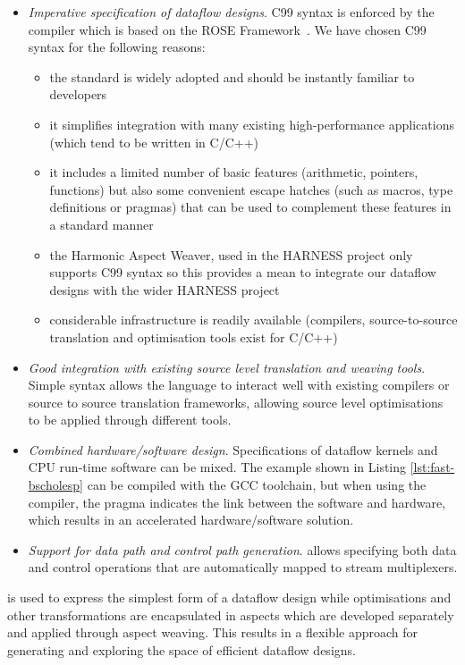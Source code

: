 \begin{itemize}
\item \emph{Imperative specification of dataflow designs}. C99 syntax
  is enforced by the \FAST{} compiler which is based on the ROSE
  Framework~\cite{Quinlan:2000}. We have chosen C99 syntax for the following reasons:
\begin{itemize}
\item the standard is widely adopted and should be instantly familiar
  to developers
\item it simplifies integration with many existing high-performance
  applications (which tend to be written in C/C++)
\item it includes a limited number of basic features (arithmetic,
  pointers, functions) but also some convenient escape hatches (such
  as macros, type definitions or pragmas) that can be used to
  complement these features in a standard manner
\item the Harmonic Aspect Weaver, used in the HARNESS project only
  supports C99 syntax so this provides a mean to integrate our
  dataflow designs with the wider HARNESS project
\item considerable infrastructure is readily available (compilers,
  source-to-source translation and optimisation tools exist for C/C++)
\end{itemize}
\item \emph{Good integration with existing source level translation and
    weaving tools}. Simple syntax allows the language to interact well
  with existing compilers or source to source translation frameworks,
  allowing source level optimisations to be applied through different
  tools.
\item \emph{Combined hardware/software design}. Specifications of dataflow
  kernels and CPU run-time software can be mixed. The example shown in
  Listing \ref{lst:fast-bscholesp} can be compiled with the GCC toolchain,
  but when using the \FAST{} compiler, the pragma indicates the link
  between the software and hardware, which results in an accelerated
  hardware/software solution.
\item \emph{Support for data path and control path generation}. \FAST{}
  allows specifying both data and control operations that are
  automatically mapped to stream multiplexers.
\end{itemize}

\FAST{} is used to express the simplest form of a dataflow design
while optimisations and other transformations are encapsulated in
aspects which are developed separately and applied through aspect
weaving. This results in a flexible approach for generating and
exploring the space of efficient dataflow designs.

